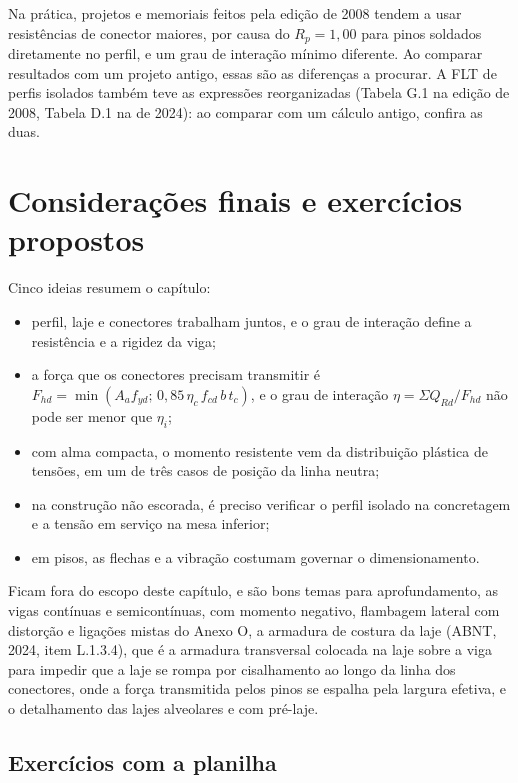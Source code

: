\documentclass[11pt,a4paper]{article}
\begin{document}
Na prática, projetos e memoriais feitos pela edição de 2008 tendem a usar resistências de conector maiores, por causa do $R_p = 1{,}00$ para pinos soldados diretamente no perfil, e um grau de interação mínimo diferente. Ao comparar resultados com um projeto antigo, essas são as diferenças a procurar. A FLT de perfis isolados também teve as expressões reorganizadas (Tabela G.1 na edição de 2008, Tabela D.1 na de 2024): ao comparar com um cálculo antigo, confira as duas.

\section{Considerações finais e exercícios propostos}

Cinco ideias resumem o capítulo:
\begin{itemize}
  \item perfil, laje e conectores trabalham juntos, e o grau de interação define a resistência e a rigidez da viga;
  \item a força que os conectores precisam transmitir é $F_{hd} = \min(A_a f_{yd};\, 0{,}85\,\eta_c\,f_{cd}\,b\,t_c)$, e o grau de interação $\eta = \Sigma Q_{Rd}/F_{hd}$ não pode ser menor que $\eta_i$;
  \item com alma compacta, o momento resistente vem da distribuição plástica de tensões, em um de três casos de posição da linha neutra;
  \item na construção não escorada, é preciso verificar o perfil isolado na concretagem e a tensão em serviço na mesa inferior;
  \item em pisos, as flechas e a vibração costumam governar o dimensionamento.
\end{itemize}

Ficam fora do escopo deste capítulo, e são bons temas para aprofundamento, as vigas contínuas e semicontínuas, com momento negativo, flambagem lateral com distorção e ligações mistas do Anexo O, a armadura de costura da laje (ABNT, 2024, item L.1.3.4), que é a armadura transversal colocada na laje sobre a viga para impedir que a laje se rompa por cisalhamento ao longo da linha dos conectores, onde a força transmitida pelos pinos se espalha pela largura efetiva, e o detalhamento das lajes alveolares e com pré-laje.

\subsection{Exercícios com a planilha}
\end{document}

